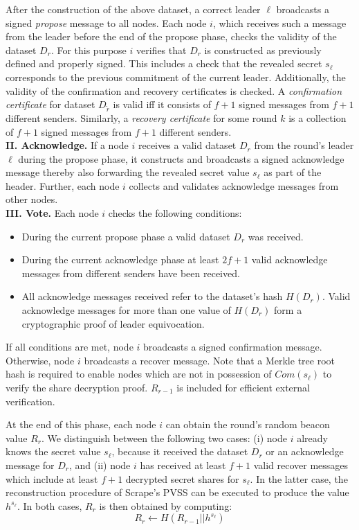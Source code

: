 \documentclass[11pt]{article}
\theoremstyle{definition}
\theoremstyle{remark}
\begin{document}
After the construction of the above dataset, a correct leader $\ell$ broadcasts a signed \textit{propose} message to all nodes. Each node $i$, which receives such a message from the leader before the end of the propose phase, checks the validity of the dataset $D_r$. For this purpose $i$ verifies that $D_r$ is constructed as previously defined and properly signed. This includes a check that the revealed secret $s_\ell$ corresponds to the previous commitment of the current leader. Additionally, the validity of the confirmation and recovery certificates is checked. A \textit{confirmation certificate} for dataset $D_{\tilde{r}}$ is valid iff it consists of $f + 1$ signed messages from $f + 1$ different senders. Similarly, a \textit{recovery certificate} for some round $k$ is a collection of $f + 1$ signed messages from $f + 1$ different senders.\\

\textbf{II. Acknowledge.} If a node $i$ receives a valid dataset $D_r$ from the round's leader $\ell$ during the propose phase, it constructs and broadcasts a signed acknowledge message thereby also forwarding the revealed secret value $s_\ell$ as part of the header. Further, each node $i$ collects and validates acknowledge messages from other nodes.\\

\textbf{III. Vote.} Each node $i$ checks the following conditions:
\begin{itemize}
\item During the current propose phase a valid dataset $D_r$ was received.
\item During the current acknowledge phase at least $2 f + 1$ valid acknowledge messages from different senders have been received.
\item All acknowledge messages received refer to the dataset's hash $H(D_r)$. Valid acknowledge messages for more than one value of $H(D_r)$ form a cryptographic proof of leader equivocation.
\end{itemize}
If all conditions are met, node $i$ broadcasts a signed confirmation message. Otherwise, node $i$ broadcasts a recover message. Note that a Merkle tree root hash is required to enable nodes which are not in possession of $Com(s_\ell)$ to verify the share decryption proof. $R_{r - 1}$ is included for efficient external verification.

At the end of this phase, each node $i$ can obtain the round's random beacon value $R_r$. We distinguish between the following two cases: (i) node $i$ already knows the secret value $s_\ell$, because it received the dataset $D_r$ or an acknowledge message for $D_r$, and (ii) node $i$ has received at least $f + 1$ valid recover messages which include at least $f + 1$ decrypted secret shares for $s_\ell$. In the latter case, the reconstruction procedure of Scrape's PVSS can be executed to produce the value $h^{s_\ell}$. In both cases, $R_r$ is then obtained by computing:
$$R_r \leftarrow H(R_{r - 1} || h^{s_\ell})$$
\end{document}
